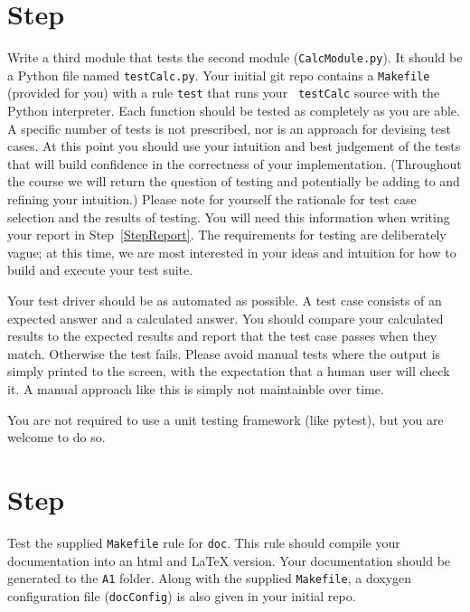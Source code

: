 \documentclass[12pt]{article}
\newcommand{\latex}{\LaTeX\xspace}
\newcounter{stepnum}
\begin{document}
\section *{Step  \label{stepTest} \thestepnum} 

Write a third module that tests the second module ({\tt CalcModule.py}).  It
should be a Python file named {\tt testCalc.py}.  Your initial git repo contains
a {\tt Makefile} (provided for you) with a rule {\tt test} that runs your {\tt
  testCalc} source with the Python interpreter.  Each function should be tested
as completely as you are able.  A specific number of tests is not prescribed,
nor is an approach for devising test cases.  At this point you should use your
intuition and best judgement of the tests that will build confidence in the
correctness of your implementation.  (Throughout the course we will return the
question of testing and potentially be adding to and refining your intuition.)
Please note for yourself the rationale for test case selection and the results
of testing.  You will need this information when writing your report in
Step~\ref{StepReport}.  The requirements for testing are deliberately vague; at
this time, we are most interested in your ideas and intuition for how to build
and execute your test suite.

Your test driver should be as automated as possible.  A test case consists of an
expected answer and a calculated answer.  You should compare your calculated
results to the expected results and report that the test case passes when they
match.  Otherwise the test fails.  Please avoid manual tests where the output is
simply printed to the screen, with the expectation that a human user will check
it.  A manual approach like this is simply not maintainble over time.

You are not required to use a unit testing framework (like pytest), but you are
welcome to do so.

\section *{Step  \thestepnum}

Test the supplied \texttt{Makefile} rule for {\tt doc}.  This rule should
compile your documentation into an html and \latex version.  Your documentation
should be generated to the \texttt{A1} folder.  Along with the supplied
\texttt{Makefile}, a doxygen configuration file (\texttt{docConfig}) is also given
in your initial repo.
\end{document}
